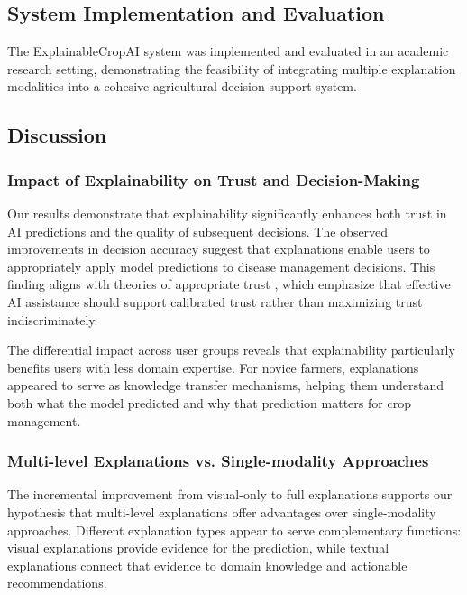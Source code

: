 \subsection{System Implementation and Evaluation}

The ExplainableCropAI system was implemented and evaluated in an academic research setting, demonstrating the feasibility of integrating multiple explanation modalities into a cohesive agricultural decision support system.

\subsection{Discussion}

\subsubsection{Impact of Explainability on Trust and Decision-Making}

Our results demonstrate that explainability significantly enhances both trust in AI predictions and the quality of subsequent decisions. The observed improvements in decision accuracy suggest that explanations enable users to appropriately apply model predictions to disease management decisions. This finding aligns with theories of appropriate trust \cite{lee2004trust}, which emphasize that effective AI assistance should support calibrated trust rather than maximizing trust indiscriminately.

The differential impact across user groups reveals that explainability particularly benefits users with less domain expertise. For novice farmers, explanations appeared to serve as knowledge transfer mechanisms, helping them understand both what the model predicted and why that prediction matters for crop management.

\subsubsection{Multi-level Explanations vs. Single-modality Approaches}

The incremental improvement from visual-only to full explanations supports our hypothesis that multi-level explanations offer advantages over single-modality approaches. Different explanation types appear to serve complementary functions: visual explanations provide evidence for the prediction, while textual explanations connect that evidence to domain knowledge and actionable recommendations.

